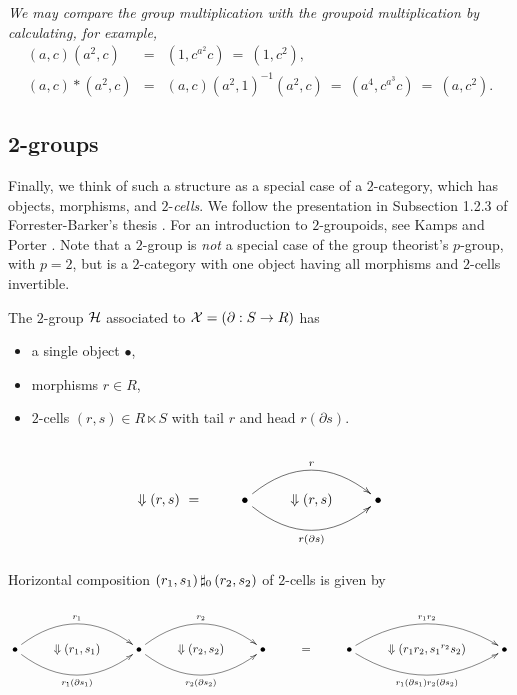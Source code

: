 \begin{example}
\noindent
\emph{We may compare the group multiplication with the groupoid multiplication
by calculating, for example,}
\begin{eqnarray*}
(a,c)(a^2,c) &=& (1,c^{a^2}c) ~=~ (1,c^2), \\
(a,c)*(a^2,c)     &=& (a,c)(a^2,1)^{-1}(a^2,c) ~=~ (a^4,c^{a^3}c) ~=~ (a,c^2).
\end{eqnarray*}
\end{example}





\newpage
\subsection{2-groups} \label{subs:twogps}

Finally, we think of such a structure as a special case of a 
   
$2$-category, which has objects, morphisms, and $2$-\emph{cells}.
We follow the presentation in Subsection 1.2.3 of 
Forrester-Barker's thesis \cite{f-b-thesis}. 
For an introduction to $2$-groupoids, 
see Kamps and Porter \cite{kamps:port}.
Note that a $2$-group is \emph{not} a special case of the group theorist's 
$p$-group, with $p=2$, but is a $2$-category with one object having all 
morphisms and $2$-cells invertible.

The $2$-group $\mathcal{H}$ associated to $\mathcal{X} = (\partial : S \to R)$ has
\begin{itemize}
\item  a single object $\bullet$,
\item  morphisms $r \in R$,
\item  $2$-cells $(r,s) \in R \ltimes S$
       with tail $r$ and head $r(\partial s)$.
\end{itemize}
$$
\xy
\xymatrix{
   & & & \\
 \Downarrow (r,s)~= 
   & \bullet  \ar@/^5ex/[rr]^{r} 
              \ar@/_5ex/[rr]_{r(\partial s)} 
     & \Downarrow (r,s)
        & \bullet \\
   & & & \\
}
\endxy
$$

\noindent
Horizontal composition $(r_1,s_1) \,\sharp_0\, (r_2,s_2)$ 
of $2$-cells is given by
$$
\xy
\xymatrix{
  & &  & & & & & & \\
  \bullet \ar@/^5ex/[rr]^{r_1} 
          \ar@/_5ex/[rr]_{r_1(\partial s_1)} 
  & \Downarrow (r_1,s_1)
    & \bullet \ar@/^5ex/[rr]^{r_2} 
              \ar@/_5ex/[rr]_{r_2(\partial s_2)} 
      & \Downarrow (r_2,s_2)
        & \bullet 
          & = 
            & \bullet \ar@/^5ex/[rr]^{r_1r_2} 
                      \ar@/_5ex/[rr]_{r_1(\partial s_1)r_2(\partial s_2)} 
              & \Downarrow (r_1r_2,{s_1}^{r_2}{s_2})
                & \bullet \\
  & & & & & & & & \\
}
\endxy
$$

